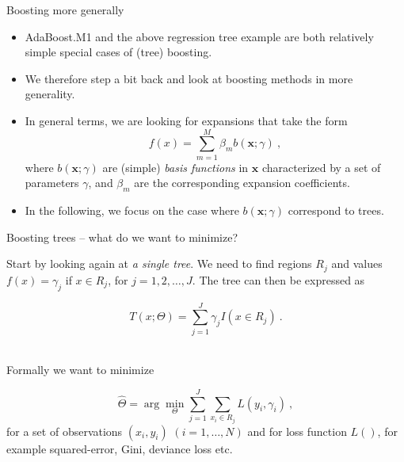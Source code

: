 \documentclass[
  10pt,
  ignorenonframetext,
]{beamer}
\providecommand{\tightlist}{%
  \setlength{\itemsep}{0pt}\setlength{\parskip}{0pt}}
\begin{document}
\begin{frame}{Boosting more generally}
\protect\hypertarget{boosting-more-generally}{}
\(~\)

\begin{itemize}
\tightlist
\item
  AdaBoost.M1 and the above regression tree example are both relatively
  simple special cases of (tree) boosting.
\end{itemize}

\vspace{2mm}

\begin{itemize}
\tightlist
\item
  We therefore step a bit back and look at boosting methods in more
  generality.
\end{itemize}

\vspace{2mm}

\begin{itemize}
\tightlist
\item
  In general terms, we are looking for expansions that take the form
  \[f(x) = \sum_{m=1}^M \beta_m b(\mathbf{x};\gamma) \ , \] where
  \(b(\mathbf{x};\gamma)\) are (simple) \emph{basis functions} in
  \(\mathbf{x}\) characterized by a set of parameters \(\gamma\), and
  \(\beta_m\) are the corresponding expansion coefficients.
\end{itemize}

\vspace{2mm}

\begin{itemize}
\tightlist
\item
  In the following, we focus on the case where \(b(\mathbf{x};\gamma)\)
  correspond to trees.
\end{itemize}
\end{frame}

\begin{frame}
\begin{block}{Boosting trees -- what do we want to minimize?}
\protect\hypertarget{boosting-trees-what-do-we-want-to-minimize}{}
\(~\)

Start by looking again at \emph{a single tree}. We need to find regions
\(R_j\) and values \(f(x)=\gamma_j\) if \(x\in R_j\), for
\(j=1,2,\ldots,J\). The tree can then be expressed as

\[T(x;\Theta) = \sum_{j=1}^J \gamma_j I(x\in R_j) \ .\] \(~\)

Formally we want to minimize

\begin{equation}\label{eq:treeopt}
\hat\Theta = \arg \min_\Theta \sum_{j=1}^J \sum_{x_i \in R_j} L(y_i,\gamma_i) \ , 
\end{equation} for a set of observations \((x_i,y_i)\)
\((i=1,\ldots,N)\) and for loss function \(L()\), for example
squared-error, Gini, deviance loss etc.
\end{block}
\end{frame}
\end{document}
